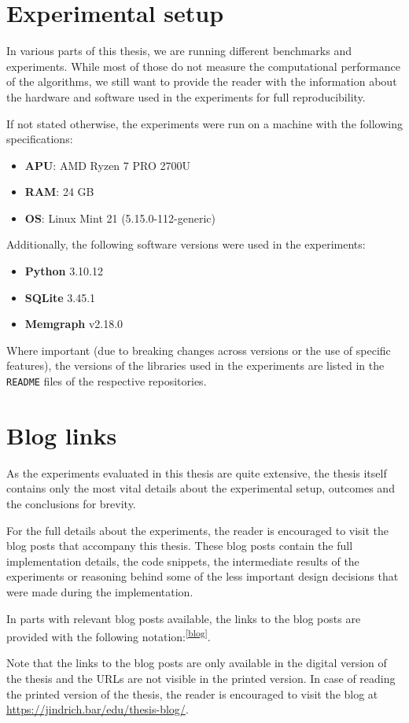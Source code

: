 \section*{Experimental setup}

In various parts of this thesis, we are running different benchmarks and experiments.
While most of those do not measure the computational performance of the algorithms, we still want to 
provide the reader with the information about the hardware and software used in the experiments for full reproducibility.

If not stated otherwise, the experiments were run on a machine with the following specifications:
\begin{itemize}
    \item \textbf{APU}: AMD Ryzen 7 PRO 2700U
    \item \textbf{RAM}: 24 GB
    \item \textbf{OS}: Linux Mint 21 (5.15.0-112-generic)
\end{itemize}

Additionally, the following software versions were used in the experiments:

\begin{itemize}
    \item \textbf{Python} 3.10.12
    \item \textbf{SQLite} 3.45.1
    \item \textbf{Memgraph} v2.18.0
\end{itemize}

Where important (due to breaking changes across versions or the use of specific features), 
the versions of the libraries used in the experiments are listed in the \texttt{README} files of the respective repositories.

\section*{Blog links}
As the experiments evaluated in this thesis are quite extensive, 
the thesis itself contains only the most vital details about the experimental setup, outcomes and the conclusions for brevity.

For the full details about the experiments, the reader is encouraged to visit the blog posts that accompany this thesis.
These blog posts contain the full implementation details, the code snippets, the intermediate results of the experiments
or reasoning behind some of the less important design decisions that were made during the implementation.

In parts with relevant blog posts available, the links to the blog posts are provided with the following notation:\textsuperscript{\href{https://barjin.github.io/edu/thesis-blog/}{[blog]}}.

Note that the links to the blog posts are only available in the digital version of the thesis and the URLs are not visible in the printed version.
In case of reading the printed version of the thesis, the reader is encouraged to visit the blog at \url{https://jindrich.bar/edu/thesis-blog/}.
